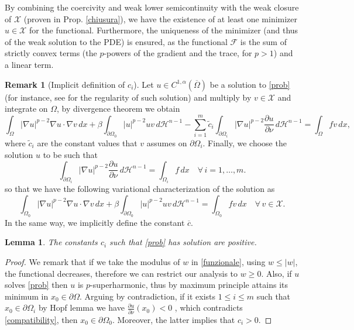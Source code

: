 \documentclass[12pt]{article}
\newcommand{\abs}[1]{{\left|#1\right|}}
\newcommand{\dH}{d\mathcal{H}^{n-1}}
\theoremstyle{definition}
\theoremstyle{plain}
\newtheorem{lemma}[teorema]{Lemma}
\theoremstyle{definition}
\newtheorem{oss}[esempio]{Remark}
\begin{document}
By combining the coercivity and weak lower semicontinuity with the weak closure of $\mathcal{X}$ (proven in Prop. \ref{chiusura}), we have the existence of at least one minimizer $u \in \mathcal{X}$ for the functional. Furthermore, the uniqueness of the minimizer (and thus of the weak solution to the PDE) is ensured, as the functional $\mathcal{F}$ is the sum of strictly convex terms (the $p$-powers of the gradient and the trace, for $p>1$) and a linear term.
\begin{oss}[Implicit definition of $c_i$]\label{Def Ci}
     Let $u\in C^{1,\alpha}(\overline{\Omega})$ be a solution to \eqref{prob} (for instance, see \cite[Theorem 2]{Lieb} for the regularity of such solution) and multiply by $v\in\mathcal{X}$ and integrate on $\Omega$, by divergence theorem we obtain
    \begin{equation*}
        \int_\Omega\abs{\nabla u}^{p-2}\nabla u\cdot\nabla v\,dx+\beta\int_{\partial\Omega_0}\abs{u}^{p-2}uv\,\dH-\sum_{i=1}^m\tilde c_i\int_{\partial\Omega_i}\abs{\nabla u}^{p-2}\frac{\partial u}{\partial\nu}\,\dH=\int_\Omega fv\,dx,
    \end{equation*}
    where $\tilde c_i$ are the constant values that $v$ assumes on $\partial\Omega_i$. Finally, we choose the solution $u$ to be such that
    \begin{equation}\label{compatibility}
        \int_{\partial\Omega_i}\abs{\nabla u}^{p-2}\frac{\partial u}{\partial\nu}\,\dH=\int_{\Omega_i}f\,dx\quad \forall\,i=1,\dots,m.
    \end{equation}
    so that we have the following variational characterization of the solution as
    \begin{equation}\label{eqdebole}
        \int_{\Omega_0}\abs{\nabla u}^{p-2}\nabla u\cdot\nabla v\,dx+\beta\int_{\partial\Omega_0}\abs{u}^{p-2}uv\,\dH=\int_{\Omega_0} fv\,dx\quad\forall\,v\in\mathcal{X}.
    \end{equation}
    In the same way, we implicitly define the constant $\overline{c}$.
\end{oss}
\begin{lemma}\label{segno ci}
    The constants $c_i$ such that \eqref{prob} has solution are positive.
\end{lemma}
\begin{proof}
    We remark that if we take the modulus of $w$ in \eqref{funzionale}, using $w\leq\abs{w}$, the functional decreases, therefore we can restrict our analysis to $w\geq0$. Also, if $u$ solves \eqref{prob} then $u$ is $p$-superharmonic, thus by maximum principle \cite{V} attains its minimum in $x_0\in\partial\Omega$. Arguing by contradiction, if it exists $1\leq i\leq m$ such that $x_0\in\partial\Omega_i$ by Hopf lemma \cite[Theorem 5.5.2]{PS} we have $\displaystyle{\frac{\partial u}{\partial\nu}(x_0)<0}$ , which contradicts \eqref{compatibility}, then $x_0\in\partial\Omega_0$. Moreover, the latter implies that $c_i>0$. 
\end{proof}
\end{document}
